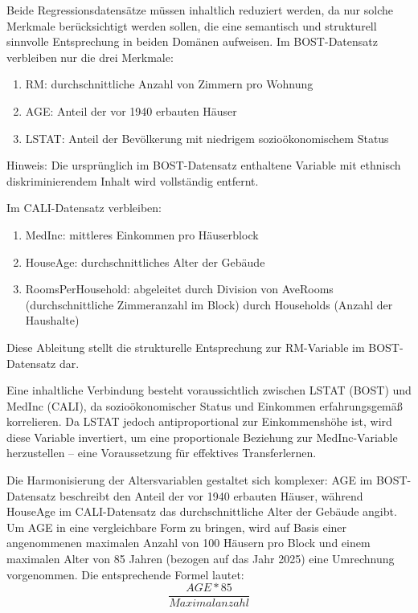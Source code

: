 Beide Regressionsdatensätze müssen inhaltlich reduziert werden, da nur solche Merkmale berücksichtigt werden sollen, die eine semantisch und 
strukturell sinnvolle Entsprechung in beiden Domänen aufweisen. Im BOST-Datensatz verbleiben nur die drei Merkmale:

\begin{enumerate}
    \item RM: durchschnittliche Anzahl von Zimmern pro Wohnung
    \item AGE: Anteil der vor 1940 erbauten Häuser
    \item LSTAT: Anteil der Bevölkerung mit niedrigem sozioökonomischem Status
\end{enumerate}

Hinweis: Die ursprünglich im BOST-Datensatz enthaltene Variable mit ethnisch diskriminierendem Inhalt wird vollständig entfernt.

Im CALI-Datensatz verbleiben:
\begin{enumerate}
    \item MedInc: mittleres Einkommen pro Häuserblock
    \item HouseAge: durchschnittliches Alter der Gebäude
    \item RoomsPerHousehold: abgeleitet durch Division von AveRooms (durchschnittliche Zimmeranzahl im Block) durch Households (Anzahl der Haushalte)
\end{enumerate}

Diese Ableitung stellt die strukturelle Entsprechung zur RM-Variable im BOST-Datensatz dar.

Eine inhaltliche Verbindung besteht voraussichtlich zwischen LSTAT (BOST) und MedInc (CALI), da sozioökonomischer Status und Einkommen 
erfahrungsgemäß korrelieren. Da LSTAT jedoch antiproportional zur Einkommenshöhe ist, wird diese Variable invertiert, um eine proportionale 
Beziehung zur MedInc-Variable herzustellen – eine Voraussetzung für effektives Transferlernen.

Die Harmonisierung der Altersvariablen gestaltet sich komplexer: AGE im BOST-Datensatz beschreibt den Anteil der vor 1940 erbauten Häuser, 
während HouseAge im CALI-Datensatz das durchschnittliche Alter der Gebäude angibt. Um AGE in eine vergleichbare Form zu bringen, wird auf 
Basis einer angenommenen maximalen Anzahl von 100 Häusern pro Block und einem maximalen Alter von 85 Jahren (bezogen auf das Jahr 2025) eine 
Umrechnung vorgenommen. Die entsprechende Formel lautet:
\begin{equation}
    \frac{AGE * 85}{Maximalanzahl}
\end{equation}

